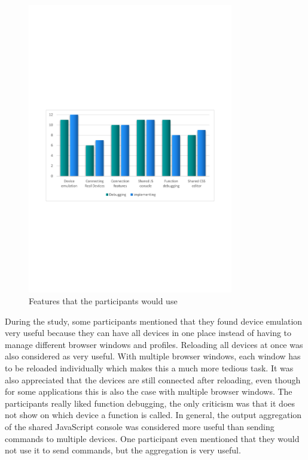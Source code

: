 \begin{figure}[H]
  \centering
    \includegraphics[width=0.8\textwidth]{images/charts/would_use_features.pdf}
	\caption[Features that participants would use]{Features that the participants would use}
	\label{fig:would_use_features}
\end{figure}

During the study, some participants mentioned that they found device emulation very useful because they can have all devices in one place instead of having to manage different browser windows and profiles. Reloading all devices at once was also considered as very useful. With multiple browser windows, each window has to be reloaded individually which makes this a much more tedious task. It was also appreciated that the devices are still connected after reloading, even though for some applications this is also the case with multiple browser windows. The participants really liked function debugging, the only criticism was that it does not show on which device a function is called. In general, the output aggregation of the shared JavaScript console was considered more useful than sending commands to multiple devices. One participant even mentioned that they would not use it to send commands, but the aggregation is very useful. 

